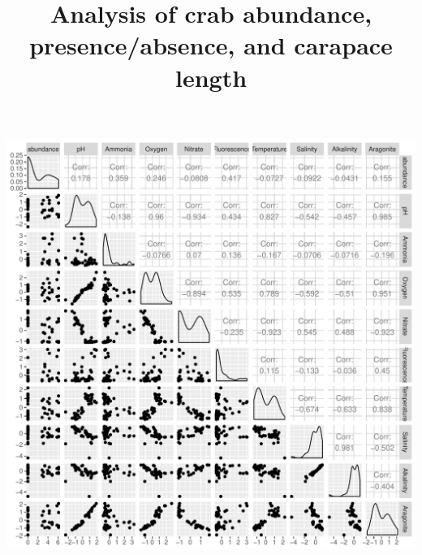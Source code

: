 \documentclass[letterpaper,12pt]{article}\usepackage[]{graphicx}\usepackage[]{color}
\makeatletter
\def\maxwidth{ %
  \ifdim\Gin@nat@width>\linewidth
    \linewidth
  \else
    \Gin@nat@width
  \fi
}
\newenvironment{knitrout}{}{} %
\makeatother
\begin{document}
\title{Analysis of crab abundance, presence/absence, and carapace length}
\maketitle



\begin{knitrout}
\color{fgcolor}
\includegraphics[width=\maxwidth]{figure/unnamed-chunk-3-1} 

\end{knitrout}
\end{document}

